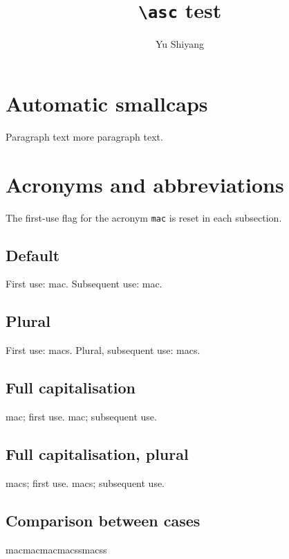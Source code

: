 \documentclass[11pt, a4paper, british]{article}
\begin{document}
	\title{\texttt{\backslash asc} test}
	\author{Yu Shiyang}


	\maketitle

	\section{Automatic smallcaps} \label{sec:links}

		Paragraph text  more paragraph text.

	\section{Acronyms and abbreviations}

		The first-use flag for the acronym \texttt{mac} is reset in each subsection.

		\subsection{Default}


			First use: \gls{mac}. Subsequent use: \gls{mac}.

		\subsection{Plural}


			First use: \glspl{mac}. Plural, subsequent use: \glspl{mac}.

		\subsection{Full capitalisation}


			\Gls{mac}; first use. \Gls{mac}; subsequent use.

		\subsection{Full capitalisation, plural}


			\Glspl{mac}; first use. \Glspl{mac}; subsequent use.

		\subsection{Comparison between cases}


			\gls{mac}\Gls{mac}\gls{mac}\Glspl{mac}s\glspl{mac}s
\end{document}
